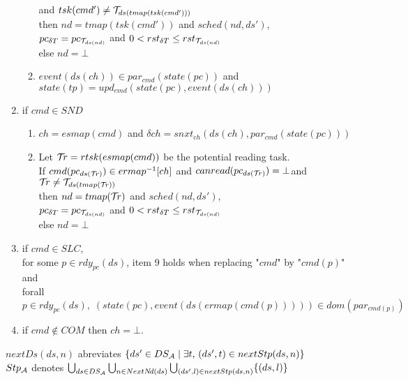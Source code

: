\documentclass{article}
\begin{document}
\begin{definition}
\begin{enumerate}
\begin{enumerate}
			\hspace*{4mm}and 
				   $tsk(cmd')\neq {\cal T}_{ds(tmap(tsk(cmd')))}$\\
				then $nd=tmap(tsk(cmd'))$ and $sched(nd,ds')$,\\
				     \hspace*{0.8cm}$pc_{\delta T}=pc_{{\cal T}_{ds(nd)}}$ and $0<rst_{\delta T}\leq rst_{{\cal T}_{ds(nd)}}$\\
				else $nd=\bot$
			\item $event(ds(ch))\in par_{cmd}(state(pc))$ and $state(tp)= upd_{cmd}(state(pc),event(ds(ch)))$
			\end{enumerate}
\item if $cmd\in S\!N\!D$
      \begin{enumerate}
			\item $ch=esmap(cmd)$ and $\delta ch=snxt_{ch}(ds(ch),par_{cmd}(state(pc)))$
			\item Let ${\cal T}\!r=rtsk(esmap(cmd))$ be the potential reading task.\\ 
				If $cmd(pc_{ds({\cal T}\!r)})\in ermap^{-1}[ch]$ and $canread(pc_{ds({\cal T}\!r)})=\bot$and 
				   ${\cal T}\!r\neq {\cal T}_{ds(tmap({\cal T}\!r))}$\\
				then $nd=tmap({\cal T}\!r)$ and $sched(nd,ds')$,\\
				     \hspace*{0.8cm}$pc_{\delta T}=pc_{{\cal T}_{ds(nd)}}$ and $0<rst_{\delta T}\leq rst_{{\cal T}_{ds(nd)}}$\\
				else $nd=\bot$
			\end{enumerate}
\item if $cmd\in S\!LC$,\\
      for some $p\in rdy_{pc}(ds)$, item 9 holds when replacing "$cmd$" by "$cmd(p)$" and\\ forall $p\in rdy_{pc}(ds),\;(state(pc),event(ds(ermap(cmd(p)))))\in dom(par_{cmd(p)})$
\item if $cmd\notin COM$ then $ch=\bot$.
\end{enumerate}
$nextDs(ds,n)$ abreviates $\{ds'\in DS_{\cal A}\mid \exists t,\, (ds',t)\in nextStp(ds,n)\}$\\
$Stp_{\cal A}$ denotes $\bigcup_{ds\in DS_{\cal A}}\bigcup_{n\in NextN\!d(ds)}\bigcup_{(ds',l)\in nextStp(ds,n)}\{(ds,l)\}$
\end{definition}
\end{document}
